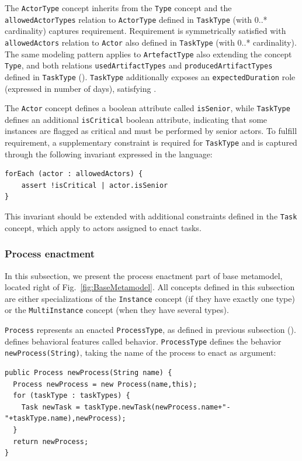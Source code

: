 The \texttt{ActorType} concept inherits from the \texttt{Type} concept and the
\texttt{allowedActorTypes} relation to \texttt{ActorType} defined in
\texttt{TaskType} (with 0..* cardinality) captures  requirement.
Requirement  is symmetrically satisfied with \texttt{allowedActors}
relation to \texttt{Actor} also defined in \texttt{TaskType} (with 0..*
cardinality). The same modeling pattern applies to \texttt{ArtefactType} also
extending the concept \texttt{Type}, and both relations
\texttt{usedArtifactTypes} and \texttt{producedArtifactTypes} defined in
\texttt{TaskType} (). \texttt{TaskType} additionally exposes an
\texttt{expectedDuration} role (expressed in number of days), satisfying
.

The \texttt{Actor} concept defines a boolean attribute called
\texttt{isSenior}, while \texttt{TaskType} defines an additional
\texttt{isCritical} boolean attribute, indicating that some instances are
flagged as critical and must be performed by senior actors. To fulfill
 requirement, a supplementary constraint is required for
\texttt{TaskType} and is captured through the following invariant expressed in
the \FML language:
\begin{lstlisting}
forEach (actor : allowedActors) {
    assert !isCritical | actor.isSenior
}
\end{lstlisting}

This invariant should be extended with additional constraints defined in the
\texttt{Task} concept, which apply to actors assigned to enact
tasks.

\subsubsection{Process enactment}
\label{sec:ProcessEnactment}
In this subsection, we present the process enactment part of base metamodel,
located right of Fig.~\ref{fig:BaseMetamodel}. All concepts defined in this
subsection are either specializations of the \texttt{Instance} concept (if they
  have exactly one type) or the \texttt{MultiInstance} concept (when they have
  several types).

\texttt{Process} represents an enacted \texttt{ProcessType}, as defined in
previous subsection (). \FML defines behavioral features called
behavior. \texttt{ProcessType} defines the behavior
\texttt{newProcess(String)}, taking the name of the process to enact as
argument:

\begin{lstlisting}
public Process newProcess(String name) {
  Process newProcess = new Process(name,this);
  for (taskType : taskTypes) {
    Task newTask = taskType.newTask(newProcess.name+"-"+taskType.name),newProcess);
  }
  return newProcess;
}
\end{lstlisting}

